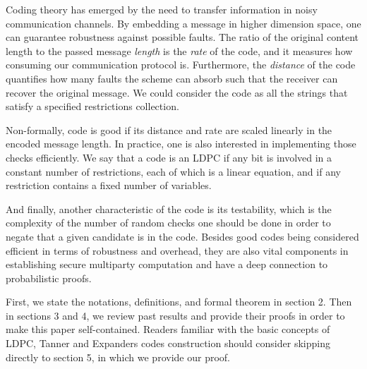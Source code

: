 Coding theory has emerged by the need to transfer information in noisy communication channels. By embedding a message in higher dimension space, one can guarantee robustness against possible faults. The ratio of the original content length to the passed message \emph{length} is the \emph{rate} of the code, and it measures how consuming our communication protocol is. Furthermore, the \emph{distance} of the code quantifies how many faults the scheme can absorb such that the receiver can recover the original message. We could consider the code as all the strings that satisfy a specified restrictions collection.
  

  Non-formally, code is good if its distance and rate are scaled linearly in the encoded message length. In practice, one is also interested in implementing those checks efficiently. We say that a code is an LDPC if any bit is involved in a constant number of restrictions, each of which is a linear equation, and if any restriction contains a fixed number of variables.

  And finally, another characteristic of the code is its testability, which is the complexity of the number of random checks one should be done in order to negate that a given candidate is in the code. Besides good codes being considered efficient in terms of robustness and overhead, they are also vital components in establishing secure multiparty computation \cite{MultiParty} and have a deep connection to probabilistic proofs.

  First, we state the notations, definitions, and formal theorem in section 2. Then in sections 3 and 4, we review past results and provide their proofs in order to make this paper self-contained. Readers familiar with the basic concepts of LDPC, Tanner and Expanders codes construction should consider skipping directly to section 5, in which we provide our proof. 

